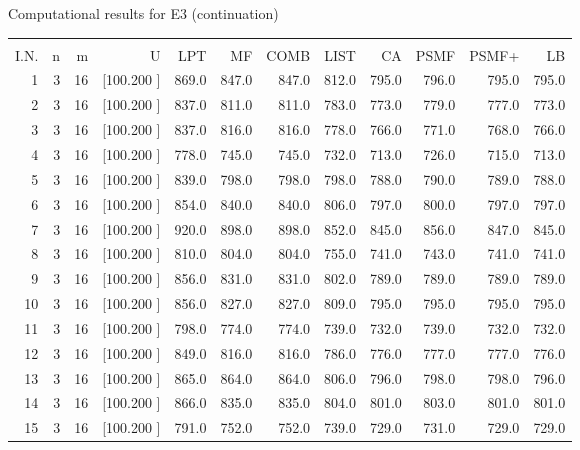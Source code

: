 \documentclass[12pt,a4paper]{article}
\begin{document}
\newpage
\begin{center}
 Computational results for E3 (continuation) {\tiny
\begin{tabular}{r r r r r r r r r r r r}\hline
    &   &   &          &        &        &        &        &        &        &        &       \\[-0.1in]
  I.N.  &  n  &  m  &  U  &  LPT  &  MF  &  COMB  &  LIST  &  CA  & PSMF &PSMF+ & LB \\[0.03in]
\hline
   1&  3& 16&[100.200   ]&   869.0&   847.0&   847.0&   812.0&   795.0&   796.0&   795.0&   795.0\\[-0.02in]
   2&  3& 16&[100.200   ]&   837.0&   811.0&   811.0&   783.0&   773.0&   779.0&   777.0&   773.0\\[-0.02in]
   3&  3& 16&[100.200   ]&   837.0&   816.0&   816.0&   778.0&   766.0&   771.0&   768.0&   766.0\\[-0.02in]
   4&  3& 16&[100.200   ]&   778.0&   745.0&   745.0&   732.0&   713.0&   726.0&   715.0&   713.0\\[-0.02in]
   5&  3& 16&[100.200   ]&   839.0&   798.0&   798.0&   798.0&   788.0&   790.0&   789.0&   788.0\\[-0.02in]
   6&  3& 16&[100.200   ]&   854.0&   840.0&   840.0&   806.0&   797.0&   800.0&   797.0&   797.0\\[-0.02in]
   7&  3& 16&[100.200   ]&   920.0&   898.0&   898.0&   852.0&   845.0&   856.0&   847.0&   845.0\\[-0.02in]
   8&  3& 16&[100.200   ]&   810.0&   804.0&   804.0&   755.0&   741.0&   743.0&   741.0&   741.0\\[-0.02in]
   9&  3& 16&[100.200   ]&   856.0&   831.0&   831.0&   802.0&   789.0&   789.0&   789.0&   789.0\\[-0.02in]
  10&  3& 16&[100.200   ]&   856.0&   827.0&   827.0&   809.0&   795.0&   795.0&   795.0&   795.0\\[-0.02in]
  11&  3& 16&[100.200   ]&   798.0&   774.0&   774.0&   739.0&   732.0&   739.0&   732.0&   732.0\\[-0.02in]
  12&  3& 16&[100.200   ]&   849.0&   816.0&   816.0&   786.0&   776.0&   777.0&   777.0&   776.0\\[-0.02in]
  13&  3& 16&[100.200   ]&   865.0&   864.0&   864.0&   806.0&   796.0&   798.0&   798.0&   796.0\\[-0.02in]
  14&  3& 16&[100.200   ]&   866.0&   835.0&   835.0&   804.0&   801.0&   803.0&   801.0&   801.0\\[-0.02in]
  15&  3& 16&[100.200   ]&   791.0&   752.0&   752.0&   739.0&   729.0&   731.0&   729.0&   729.0\\[-0.02in]

\end{tabular}}
\end{center}
\end{document}
